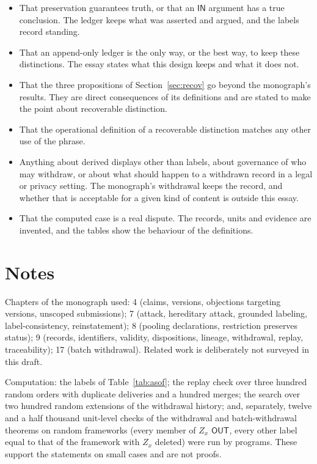 \documentclass[11pt]{article}
\theoremstyle{plain}
\theoremstyle{definition}
\theoremstyle{remark}
\newcommand{\IN}{\textsf{IN}}
\newcommand{\OUT}{\textsf{OUT}}
\begin{document}
\begin{itemize}
\item That preservation guarantees truth, or that an $\IN$ argument has a true conclusion. The ledger keeps what was asserted and argued, and the labels record standing.
\item That an append-only ledger is the only way, or the best way, to keep these distinctions. The essay states what this design keeps and what it does not.
\item That the three propositions of Section~\ref{sec:recov} go beyond the monograph's results. They are direct consequences of its definitions and are stated to make the point about recoverable distinction.
\item That the operational definition of a recoverable distinction matches any other use of the phrase.
\item Anything about derived displays other than labels, about governance of who may withdraw, or about what should happen to a withdrawn record in a legal or privacy setting. The monograph's withdrawal keeps the record, and whether that is acceptable for a given kind of content is outside this essay.
\item That the computed case is a real dispute. The records, units and evidence are invented, and the tables show the behaviour of the definitions.
\end{itemize}

\section*{Notes}

Chapters of the monograph used: 4 (claims, versions, objections targeting versions, unscoped submissions); 7 (attack, hereditary attack, grounded labeling, label-consistency, reinstatement); 8 (pooling declarations, restriction preserves status); 9 (records, identifiers, validity, dispositions, lineage, withdrawal, replay, traceability); 17 (batch withdrawal). Related work is deliberately not surveyed in this draft.

Computation: the labels of Table~\ref{tab:asof}; the replay check over three hundred random orders with duplicate deliveries and a hundred merges; the search over two hundred random extensions of the withdrawal history; and, separately, twelve and a half thousand unit-level checks of the withdrawal and batch-withdrawal theorems on random frameworks (every member of $Z_x$ $\OUT$, every other label equal to that of the framework with $Z_x$ deleted) were run by programs. These support the statements on small cases and are not proofs.

\end{document}
